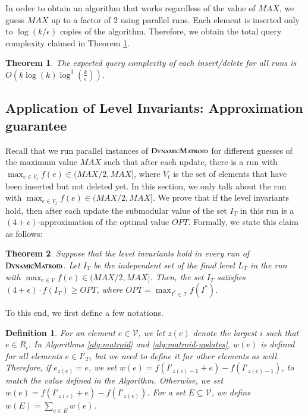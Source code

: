 \documentclass[11pt]{article}
\newtheorem{theorem}{Theorem}
\newtheorem{definition}{Definition}[section]
\newcommand{\mO}{O}
\newcommand{\dynamicmatroid}{\textsc{DynamicMatroid}}
\newcommand{\ground}{\ensuremath{\mathcal{V}}}
\newcommand{\marginalgain}[2]{f(#2 + #1) - f(#2)}
\begin{document}
In order to obtain an algorithm that works regardless of the value of $MAX$, we guess $MAX$ up to a factor of $2$ using parallel runs.
Each element is inserted only to $\log(k/\epsilon)$ copies of the algorithm. Therefore, we obtain the total query complexity claimed in Theorem \ref{thm:matroid:query_complexity}.

\begin{theorem}
\label{thm:matroid:query_complexity}
  The expected query complexity of each insert/delete for all runs is $\mO\left(k\log(k)\log^3\left(\frac{k}{\epsilon}\right)\right)$.
\end{theorem}



\subsection{Application of Level Invariants: Approximation guarantee}
Recall that we run parallel instances of $\dynamicmatroid{}$ for different guesses of the maximum value $MAX$ such that after each update, there is a run with $\max_{e \in V_t} f(e) \in (MAX/2, MAX]$, where $V_t$ is the set of elements that have been inserted but not deleted yet. 
In this section, we only talk about the run with $\max_{e \in V_t} f(e) \in (MAX/2, MAX]$.
We prove that if the level invariants hold, then after each update the submodular value of the set $I_T$ in this run is a $(4+\epsilon)$-approximation 
of the optimal value $OPT$. Formally, we state this claim as follows: 

\begin{theorem}
\label{thm:survivor:gives:approximation}
Suppose that the level invariants hold in every run of $\dynamicmatroid{}$. 
Let $I_T$ be the independent set of the final level $L_T$ in the run with $\max_{e \in V} f(e) \in (MAX/2, MAX]$. 
Then, the set $I_T$ satisfies $(4 + \epsilon) \cdot f(I_T) \ge  OPT$, 
where $OPT = \max_{I^* \in \mathcal{I}} f(I^*)$.
\end{theorem}

To this end, we first define a few notations.
\begin{definition}
    For an element $e \in \ground$, we let $z(e)$ denote the largest $i$ such that $e \in R_i$.
    In Algorithms \ref{alg:matroid} and \ref{alg:matroid-updates}, $w(e)$ is defined for all elements $e\in I'_T$, but we need to define it for other elements as well. Therefore, if $e_{z(e)} = e$, we set $w(e)  = \marginalgain{e}{I'_{z(e) - 1}}$, to match the value defined in the Algorithm. Otherwise, we set $w(e) = \marginalgain{e}{I'_{z(e)}}$.
    For a set $E \subseteq \ground$, we define $w(E)=\sum_{e\in E} w(e)$.
\end{definition}
\end{document}
